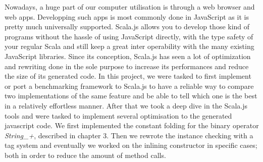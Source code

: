 Nowadays, a huge part of our computer utilisation is through a web browser and web apps.
Developping such apps is most commonly done in JavaScript as it is pretty much universally supported. Scala.js allows you to develop those kind of programs without the hassle of using JavaScript directly, with the type safety of your regular Scala and still keep a great inter operability with the many existing JavaScript libraries.
Since its conception, Scala.js has seen a lot of optimization and rewriting done in the sole purpose to increase its performances and reduce the size of its generated code.
In this project, we were tasked to first implement or port a benchmarking framework to Scala.js to have a reliable way to compare two implementations of the same feature and be able to tell which one is the best in a relatively effortless manner.
After that we took a deep dive in the Scala.js tools and were tasked to implement several optimisation to the generated javascript code. We first implemented the constant folding for the binary operator \emph{String\_+}, described in chapter 3. Then we rewrote the instance checking with a tag system and eventually we worked on the inlining constructor in specific cases; both in order to reduce the amount of method calls.
